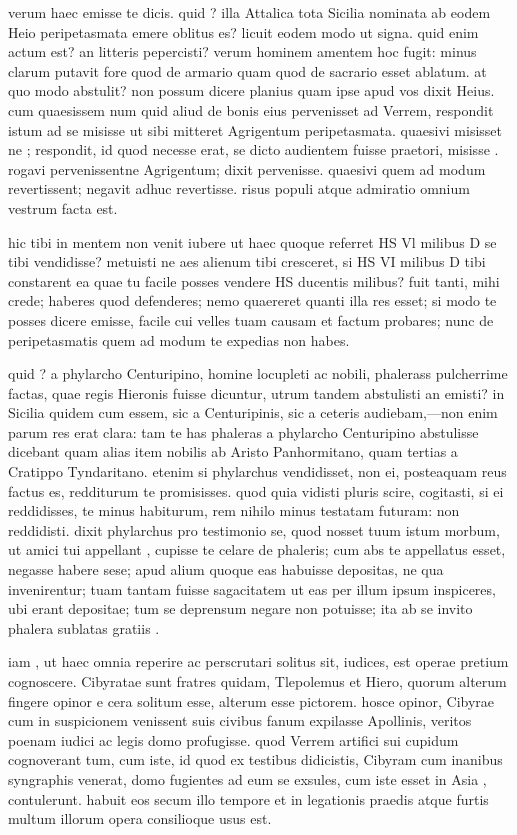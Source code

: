  verum haec emisse te dicis. quid ? illa Attalica tota Sicilia nominata ab eodem Heio peripetasmata emere oblitus es? licuit eodem modo ut signa. quid enim actum est? an litteris pepercisti? verum hominem amentem hoc fugit: minus clarum putavit fore quod de armario quam quod de sacrario esset ablatum. at quo modo abstulit? non possum dicere planius quam ipse apud vos dixit Heius. cum quaesissem num quid aliud de bonis eius pervenisset ad Verrem, respondit istum ad se misisse ut sibi mitteret Agrigentum peripetasmata. quaesivi misisset ne ; respondit, id quod necesse erat, se dicto audientem fuisse praetori, misisse . rogavi pervenissentne Agrigentum; dixit pervenisse. quaesivi quem ad modum revertissent; negavit adhuc revertisse. risus populi atque admiratio omnium vestrum facta est.

 hic tibi in mentem non venit iubere ut haec quoque referret HS Vl milibus D se tibi vendidisse? metuisti ne aes alienum tibi cresceret, si HS VI milibus D tibi constarent ea quae tu facile posses vendere HS ducentis milibus? fuit tanti, mihi crede; haberes quod defenderes; nemo quaereret quanti illa res esset; si modo te posses dicere emisse, facile cui velles tuam causam et factum probares; nunc de peripetasmatis quem ad modum te expedias non habes.

 quid ? a phylarcho Centuripino, homine locupleti ac nobili, phalerass pulcherrime factas, quae regis Hieronis fuisse dicuntur, utrum tandem abstulisti an emisti? in Sicilia quidem cum essem, sic a Centuripinis, sic a ceteris audiebam,—non enim parum res erat clara: tam te has phaleras a phylarcho Centuripino abstulisse dicebant quam alias item nobilis ab Aristo Panhormitano, quam tertias a Cratippo Tyndaritano. etenim si phylarchus vendidisset, non ei, posteaquam reus factus es, redditurum te promisisses. quod quia vidisti pluris scire, cogitasti, si ei reddidisses, te minus habiturum, rem nihilo minus testatam futuram: non reddidisti. dixit phylarchus pro testimonio se, quod nosset tuum istum morbum, ut amici tui appellant , cupisse te celare de phaleris; cum abs te appellatus esset, negasse habere sese; apud alium quoque eas habuisse depositas, ne qua invenirentur; tuam tantam fuisse sagacitatem ut eas per illum ipsum inspiceres, ubi erant depositae; tum se deprensum negare non potuisse; ita ab se invito phalera sublatas gratiis .

 iam , ut haec omnia reperire ac perscrutari solitus sit, iudices, est operae pretium cognoscere. Cibyratae sunt fratres quidam, Tlepolemus et Hiero, quorum alterum fingere opinor e cera solitum esse, alterum esse pictorem. hosce opinor, Cibyrae cum in suspicionem venissent suis civibus fanum expilasse Apollinis, veritos poenam iudici ac legis domo profugisse. quod Verrem artifici sui cupidum cognoverant tum, cum iste, id quod ex testibus didicistis, Cibyram cum inanibus syngraphis venerat, domo fugientes ad eum se exsules, cum iste esset in Asia , contulerunt. habuit eos secum illo tempore et in legationis praedis atque furtis multum illorum opera consilioque usus est.

